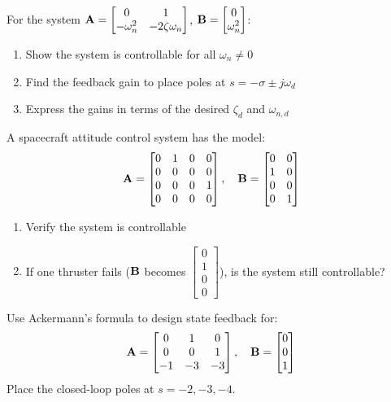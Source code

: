 \begin{exercise}
For the system $\mathbf{A} = \begin{bmatrix} 0 & 1 \\ -\omega_n^2 & -2\zeta\omega_n \end{bmatrix}$, $\mathbf{B} = \begin{bmatrix} 0 \\ \omega_n^2 \end{bmatrix}$:
\begin{enumerate}
\item Show the system is controllable for all $\omega_n \neq 0$
\item Find the feedback gain to place poles at $s = -\sigma \pm j\omega_d$
\item Express the gains in terms of the desired $\zeta_d$ and $\omega_{n,d}$
\end{enumerate}
\end{exercise}

\begin{exercise}
A spacecraft attitude control system has the model:
\begin{equation}
\mathbf{A} = \begin{bmatrix} 0 & 1 & 0 & 0 \\ 0 & 0 & 0 & 0 \\ 0 & 0 & 0 & 1 \\ 0 & 0 & 0 & 0 \end{bmatrix}, \quad
\mathbf{B} = \begin{bmatrix} 0 & 0 \\ 1 & 0 \\ 0 & 0 \\ 0 & 1 \end{bmatrix}
\end{equation}
\begin{enumerate}
\item Verify the system is controllable
\item If one thruster fails ($\mathbf{B}$ becomes $\begin{bmatrix} 0 \\ 1 \\ 0 \\ 0 \end{bmatrix}$), is the system still controllable?
\end{enumerate}
\end{exercise}

\begin{exercise}
Use Ackermann's formula to design state feedback for:
\begin{equation}
\mathbf{A} = \begin{bmatrix} 0 & 1 & 0 \\ 0 & 0 & 1 \\ -1 & -3 & -3 \end{bmatrix}, \quad
\mathbf{B} = \begin{bmatrix} 0 \\ 0 \\ 1 \end{bmatrix}
\end{equation}
Place the closed-loop poles at $s = -2, -3, -4$.
\end{exercise}

